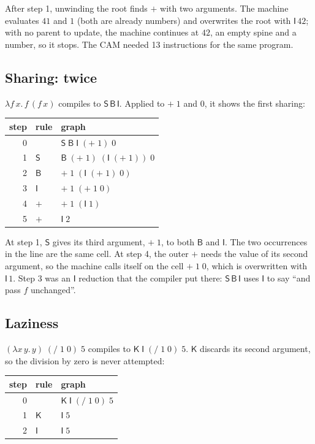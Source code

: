 \documentclass[11pt,a4paper]{article}
\newcommand{\cmb}[1]{\textsf{#1}}
\newcommand{\I}{\cmb{I}}
\newcommand{\K}{\cmb{K}}
\newcommand{\Sc}{\cmb{S}}
\newcommand{\B}{\cmb{B}}
\theoremstyle{definition}
\theoremstyle{plain}
\begin{document}
\noindent
After step 1, unwinding the root finds ${+}$ with two arguments. The machine
evaluates $41$ and $1$ (both are already numbers) and overwrites the root
with $\I\,42$; with no parent to update, the machine continues at $42$, an
empty spine and a number, so it stops. The CAM needed 13 instructions for the
same program.

\subsection{Sharing: twice}

$\lambda f\,x.\,f\,(f\,x)$ compiles to $\Sc\,\B\,\I$. Applied to ${+}\;1$
and $0$, it shows the first sharing:

\begin{center}
\small
\begin{tabular}{@{}r l l@{}}
\toprule
step & rule & graph\\
\midrule
0 & & $\Sc\;\B\;\I\;({+}\;1)\;0$\\
1 & $\Sc$ & $\B\;({+}\;1)\;(\I\;({+}\;1))\;0$\\
2 & $\B$ & ${+}\;1\;(\I\;({+}\;1)\;0)$\\
3 & $\I$ & ${+}\;1\;({+}\;1\;0)$\\
4 & ${+}$ & ${+}\;1\;(\I\;1)$\\
5 & ${+}$ & $\I\;2$\\
\bottomrule
\end{tabular}
\end{center}

\noindent
At step 1, $\Sc$ gives its third argument, ${+}\;1$, to both $\B$ and $\I$.
The two occurrences in the line are the same cell. At step 4, the outer
${+}$ needs the value of its second argument, so the machine calls itself on
the cell ${+}\;1\;0$, which is overwritten with $\I\,1$. Step 3 was
an $\I$ reduction that the compiler put there: $\Sc\,\B\,\I$ uses $\I$ to say
``and pass $f$ unchanged''.

\subsection{Laziness}

$(\lambda x\,y.\,y)\;({/}\;1\;0)\;5$ compiles to $\K\;\I\;({/}\;1\;0)\;5$.
$\K$ discards its second argument, so the division by zero is never
attempted:

\begin{center}
\small
\begin{tabular}{@{}r l l@{}}
\toprule
step & rule & graph\\
\midrule
0 & & $\K\;\I\;({/}\;1\;0)\;5$\\
1 & $\K$ & $\I\;5$\\
2 & $\I$ & $\I\;5$\\
\bottomrule
\end{tabular}
\end{center}
\end{document}

